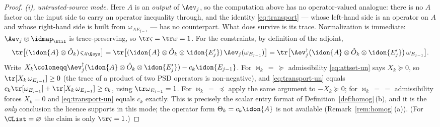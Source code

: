 \begin{proof}
\emph{(i), untrusted-source mode.} Here $A$ is an \emph{output} of
$\Aev_j$, so the computation above has no operator-valued analogue:
there is no $A$ factor on the input side to carry an operator
inequality through, and the identity \eqref{eq:transport} --- whose
left-hand side is an operator on $A$ and whose right-hand side is built
from $\omega_{AE_{j-1}}$ --- has no counterpart. What does survive is
its trace. Normalization is immediate: $\Aev_j\otimes\idmap_{\Etil}$ is
trace-preserving, so $\tr\varsigma=\tr\omega=1$. For the constraints,
by definition of the adjoint,
\begin{equation}\label{eq:transport-un}
  \tr\big[(\idon{A}\otimes\hat O_k)\,\varsigma_{A\Qsys}\big]
  =\tr\big[(\idon{A}\otimes\hat O_k\otimes\idon{E'_j})\,
  \Aev_j(\omega_{E_{j-1}})\big]
  =\tr\big[\Aev_j^{\dagger}
  \big(\idon{A}\otimes\hat O_k\otimes\idon{E'_j}\big)\,
  \omega_{E_{j-1}}\big].
\end{equation}
Write $X_k\coloneqq
\Aev_j^{\dagger}(\idon{A}\otimes\hat O_k\otimes\idon{E'_j})
-c_k\idon{E_{j-1}}$. For $\bowtie_k\,=\,\succeq$ admissibility
\eqref{eq:attset-un} says $X_k\succeq0$, so
$\tr[X_k\,\omega_{E_{j-1}}]\ge0$ (the trace of a product of two PSD
operators is non-negative), and \eqref{eq:transport-un} equals
$c_k\tr[\omega_{E_{j-1}}]+\tr[X_k\,\omega_{E_{j-1}}]\ge c_k$, using
$\tr\omega_{E_{j-1}}=1$. For $\bowtie_k\,=\,\preceq$ apply the same
argument to $-X_k\succeq0$; for $\bowtie_k\,=\,=$ admissibility forces
$X_k=0$ and \eqref{eq:transport-un} equals $c_k$ exactly. This is
precisely the scalar entry format of
Definition~\ref{def:homog}\,(b), and it is the \emph{only} conclusion
the licence supports in this mode; the operator form
$\Theta_k=c_k\idon{A}$ is not available (Remark~\ref{rem:homog}\,(a)).
(For $\CList=\varnothing$ the claim is only $\tr\varsigma=1$.)


\end{proof}
